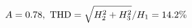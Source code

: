 \documentclass[preview]{standalone}
\begin{document}
\begin{align*}
\special{dvisvgm:raw <g id='unique000'>}A=0.78,\ \text{THD}=\sqrt{H_2^2+H_3^2}/H_1=14.2\%\special{dvisvgm:raw </g>}
\end{align*}
\end{document}
